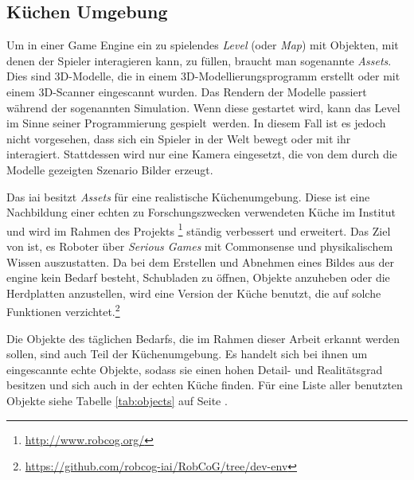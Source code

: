 \subsection{Küchen Umgebung}
\label{subsec:kitchenenvironment}
Um in einer Game Engine ein zu spielendes \textit{Level} (oder \textit{Map}) mit Objekten, mit denen der Spieler interagieren kann, zu füllen, braucht man sogenannte \textit{Assets}. Dies sind 3D-Modelle, die in einem 3D-Modellierungsprogramm erstellt oder mit einem 3D-Scanner eingescannt wurden. Das Rendern der Modelle passiert während der sogenannten Simulation. Wenn diese gestartet wird, kann das Level im Sinne seiner Programmierung \glqq gespielt\grqq \ werden. In diesem Fall ist es jedoch nicht vorgesehen, dass sich ein Spieler in der Welt bewegt oder mit ihr interagiert. Stattdessen wird nur eine Kamera eingesetzt, die von dem durch die Modelle gezeigten Szenario Bilder erzeugt.  \par

Das \gls{iai} besitzt \textit{Assets} für eine realistische Küchenumgebung. Diese ist eine Nachbildung einer echten zu Forschungszwecken verwendeten Küche im Institut und wird im Rahmen des Projekts \robcog\footnote{\url{http://www.robcog.org/}} ständig verbessert und erweitert. Das Ziel von \robcog ist, es Roboter über \textit{Serious Games} mit Commonsense und physikalischem Wissen auszustatten. Da bei dem Erstellen und Abnehmen eines Bildes aus der \acrshort{engine} kein Bedarf besteht, Schubladen zu öffnen, Objekte anzuheben oder die Herdplatten anzustellen, wird eine Version der Küche benutzt, die auf solche Funktionen verzichtet.\footnote{\url{https://github.com/robcog-iai/RobCoG/tree/dev-env}} \par

Die Objekte des täglichen Bedarfs, die im Rahmen dieser Arbeit erkannt werden sollen, sind auch Teil der Küchenumgebung. Es handelt sich bei ihnen um eingescannte echte Objekte, sodass sie einen hohen Detail- und Realitätsgrad besitzen und sich auch in der echten Küche finden. Für eine Liste aller benutzten Objekte siehe Tabelle \ref{tab:objects} auf Seite \pageref{tab:objects}.
 
